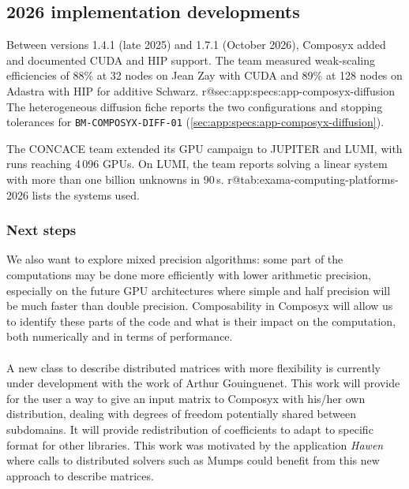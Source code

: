 

\subsection{2026 implementation developments}

Between versions 1.4.1 (late 2025) and 1.7.1 (October 2026), Composyx
added and documented CUDA and HIP support. The team measured
weak-scaling efficiencies of 88\% at 32 nodes on Jean Zay with CUDA
and 89\% at 128 nodes on Adastra with HIP for additive Schwarz.
\ifcsname r@sec:app:specs:app-composyx-diffusion\endcsname
The heterogeneous diffusion fiche reports the two configurations and
stopping tolerances for \nolinkurl{BM-COMPOSYX-DIFF-01}
(\cref{sec:app:specs:app-composyx-diffusion}).
\fi

The CONCACE team extended its GPU campaign to JUPITER and LUMI,
with runs reaching 4\,096 GPUs. On LUMI, the team reports solving
a linear system with more than one billion unknowns in 90\,s.
\ifcsname r@tab:exama-computing-platforms-2026\endcsname
{} lists the systems used.
\fi

\subsubsection{Next steps}

We also want to explore mixed precision algorithms: some part of the
computations may be done more efficiently with lower arithmetic
precision, especially on the future GPU architectures where simple and
half precision will be much faster than double precision.
Composability in Composyx will allow us to identify these parts of the
code and what is their impact on the computation, both numerically and
in terms of performance.

\paragraph{}

A new class to describe distributed matrices with more flexibility is
currently under development with the work of Arthur Gouinguenet. This
work will provide for the user a way to give an input matrix to
Composyx with his/her own distribution, dealing with degrees of
freedom potentially shared between subdomains. It will provide
redistribution of coefficients to adapt to specific format for other
libraries. This work was motivated by the application \textit{Hawen}
where calls to distributed solvers such as Mumps could benefit from
this new approach to describe matrices.

